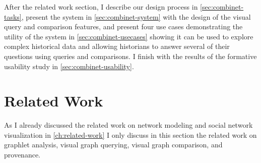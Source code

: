 
After the related work section, I describe our design process in \autoref{sec:combinet-tasks}, present the system \name in \autoref{sec:combinet-system} with the design of the visual query and comparison features, and present four use cases demonstrating the utility of the system in \autoref{sec:combinet-usecases} showing it can be used to explore complex historical data and allowing historians to answer several of their questions using queries and comparisons.
I finish with the results of the formative usability study in \autoref{sec:combinet-usability}.



\section{Related Work}\label{sec:combinet:related-work}

As I already discussed the related work on network modeling and social network visualization in \autoref{ch:related-work} I only discuss in this section the related work on graphlet analysis, visual graph querying, visual graph comparison, and provenance.


